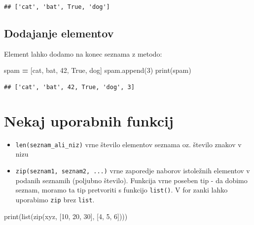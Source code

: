 \documentclass[
]{report}
\newenvironment{Shaded}{\begin{snugshade}}{\end{snugshade}}
\newcommand{\BuiltInTok}[1]{#1}
\newcommand{\DecValTok}[1]{\textcolor[rgb]{0.00,0.00,0.81}{#1}}
\newcommand{\NormalTok}[1]{#1}
\newcommand{\OperatorTok}[1]{\textcolor[rgb]{0.81,0.36,0.00}{\textbf{#1}}}
\newcommand{\StringTok}[1]{\textcolor[rgb]{0.31,0.60,0.02}{#1}}
\newcommand{\VariableTok}[1]{\textcolor[rgb]{0.00,0.00,0.00}{#1}}
\begin{document}
\begin{verbatim}
## ['cat', 'bat', True, 'dog']
\end{verbatim}

\hypertarget{dodajanje-elementov}{%
\subsection{Dodajanje elementov}\label{dodajanje-elementov}}

Element lahko dodamo na konec seznama z metodo:

\begin{Shaded}
\begin{Highlighting}[]
\NormalTok{spam }\OperatorTok{=}\NormalTok{ [}\StringTok{\textquotesingle{}cat\textquotesingle{}}\NormalTok{, }\StringTok{\textquotesingle{}bat\textquotesingle{}}\NormalTok{, }\DecValTok{42}\NormalTok{, }\VariableTok{True}\NormalTok{, }\StringTok{\textquotesingle{}dog\textquotesingle{}}\NormalTok{]}
\NormalTok{spam.append(}\DecValTok{3}\NormalTok{)}
\BuiltInTok{print}\NormalTok{(spam)}
\end{Highlighting}
\end{Shaded}

\begin{verbatim}
## ['cat', 'bat', 42, True, 'dog', 3]
\end{verbatim}

\hypertarget{nekaj-uporabnih-funkcij}{%
\section{Nekaj uporabnih funkcij}\label{nekaj-uporabnih-funkcij}}

\begin{itemize}
\item
  \texttt{len(seznam\_ali\_niz)} vrne število elementov seznama oz. število znakov v nizu
\item
  \texttt{zip(seznam1,\ seznam2,\ ...)} vrne zaporedje naborov istoležnih elementov v podanih seznamih (poljubno število). Funkcija
  vrne poseben tip - da dobimo seznam, moramo ta tip pretvoriti s funkcijo \texttt{list()}.
  V for zanki lahko uporabimo \texttt{zip} brez \texttt{list}.
\end{itemize}

\begin{Shaded}
\begin{Highlighting}[]
\BuiltInTok{print}\NormalTok{(}\BuiltInTok{list}\NormalTok{(}\BuiltInTok{zip}\NormalTok{(}\StringTok{\textquotesingle{}xyz\textquotesingle{}}\NormalTok{, [}\DecValTok{10}\NormalTok{, }\DecValTok{20}\NormalTok{, }\DecValTok{30}\NormalTok{], [}\DecValTok{4}\NormalTok{, }\DecValTok{5}\NormalTok{, }\DecValTok{6}\NormalTok{])))}
\end{Highlighting}
\end{Shaded}
\end{document}
